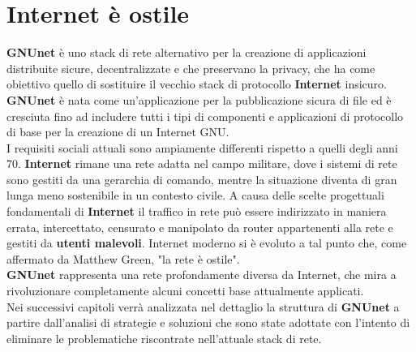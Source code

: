 \chapter{Internet è ostile}
    \textbf{GNUnet} è uno stack di rete alternativo per la creazione di applicazioni distribuite sicure, decentralizzate e che preservano la privacy, che ha come obiettivo quello di sostituire il vecchio stack di protocollo \textbf{Internet} insicuro. \textbf{GNUnet} è nata come un'applicazione per la pubblicazione sicura di file ed è cresciuta fino ad includere tutti i tipi di componenti e applicazioni di protocollo di base per la creazione di un Internet GNU.\\
    I requisiti sociali attuali sono ampiamente differenti rispetto a quelli degli anni 70. \textbf{Internet} rimane una rete adatta nel campo militare, dove i sistemi di rete sono gestiti da una gerarchia di comando, mentre la situazione diventa di gran lunga meno sostenibile in un contesto civile.
    A causa delle scelte progettuali fondamentali di \textbf{Internet} il traffico in rete può essere indirizzato in maniera errata, intercettato, censurato e manipolato da router appartenenti alla rete e gestiti da \textbf{utenti malevoli}. Internet moderno si è evoluto a tal punto che, come affermato da Matthew Green, "la rete è ostile"\cite{network}. \\
    \textbf{GNUnet} rappresenta una rete profondamente diversa da Internet, che mira a rivoluzionare completamente alcuni concetti base attualmente applicati.\\
    Nei successivi capitoli verrà analizzata nel dettaglio la struttura di \textbf{GNUnet} a partire dall'analisi di strategie e soluzioni che sono state adottate con l'intento di eliminare le problematiche riscontrate nell'attuale stack di rete.